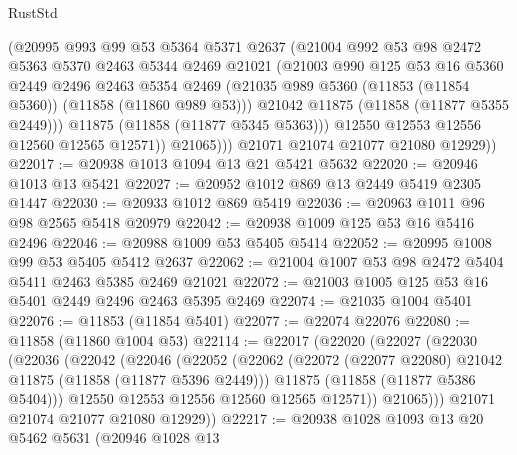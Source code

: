 \begin{lexlean}{RustStd}
\begin{coremodule}
                (@20995
                  @993
                  @99
                  @53
                  @5364
                  @5371
                  @2637
                  (@21004
                    @992
                    @53
                    @98
                    @2472
                    @5363
                    @5370
                    @2463
                    @5344
                    @2469
                    @21021
                    (@21003
                      @990
                      @125
                      @53
                      @16
                      @5360
                      @2449
                      @2496
                      @2463
                      @5354
                      @2469
                      (@21035 @989 @5360 (@11853 (@11854 @5360)) (@11858 (@11860 @989 @53)))
                      @21042
                      @11875
                      (@11858 (@11877 @5355 @2449)))
                    @11875
                    (@11858 (@11877 @5345 @5363)))
                  @12550
                  @12553
                  @12556
                  @12560
                  @12565
                  @12571))
              @21065)))
        @21071
        @21074
        @21077
        @21080
        @12929))
@22017 := @20938 @1013 @1094 @13 @21 @5421 @5632
@22020 := @20946 @1013 @13 @5421
@22027 := @20952 @1012 @869 @13 @2449 @5419 @2305 @1447
@22030 := @20933 @1012 @869 @5419
@22036 := @20963 @1011 @96 @98 @2565 @5418 @20979
@22042 := @20938 @1009 @125 @53 @16 @5416 @2496
@22046 := @20988 @1009 @53 @5405 @5414
@22052 := @20995 @1008 @99 @53 @5405 @5412 @2637
@22062 := @21004 @1007 @53 @98 @2472 @5404 @5411 @2463 @5385 @2469 @21021
@22072 := @21003 @1005 @125 @53 @16 @5401 @2449 @2496 @2463 @5395 @2469
@22074 := @21035 @1004 @5401
@22076 := @11853 (@11854 @5401)
@22077 := @22074 @22076
@22080 := @11858 (@11860 @1004 @53)
@22114 := @22017
    (@22020
      (@22027
        (@22030
          (@22036
            (@22042
              (@22046
                (@22052
                  (@22062
                    (@22072 (@22077 @22080) @21042 @11875 (@11858 (@11877 @5396 @2449)))
                    @11875
                    (@11858 (@11877 @5386 @5404)))
                  @12550
                  @12553
                  @12556
                  @12560
                  @12565
                  @12571))
              @21065)))
        @21071
        @21074
        @21077
        @21080
        @12929))
@22217 := @20938
    @1028
    @1093
    @13
    @20
    @5462
    @5631
    (@20946
      @1028
      @13

\end{coremodule}
\end{lexlean}
